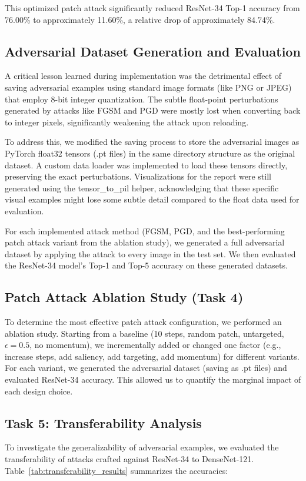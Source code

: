 \documentclass[letterpaper]{article}
\begin{document}
This optimized patch attack significantly reduced ResNet-34 Top-1 accuracy from 76.00\% to approximately 11.60\%, a relative drop of approximately 84.74\%.


\subsection{Adversarial Dataset Generation and Evaluation}
A critical lesson learned during implementation was the detrimental effect of saving adversarial examples using standard image formats (like PNG or JPEG) that employ 8-bit integer quantization. The subtle float-point perturbations generated by attacks like FGSM and PGD were mostly lost when converting back to integer pixels, significantly weakening the attack upon reloading.

To address this, we modified the saving process to store the adversarial images as PyTorch float32 tensors (.pt files) in the same directory structure as the original dataset. A custom data loader was implemented to load these tensors directly, preserving the exact perturbations. Visualizations for the report were still generated using the tensor\_to\_pil helper, acknowledging that these specific visual examples might lose some subtle detail compared to the float data used for evaluation.

For each implemented attack method (FGSM, PGD, and the best-performing patch attack variant from the ablation study), we generated a full adversarial dataset by applying the attack to every image in the test set. We then evaluated the ResNet-34 model's Top-1 and Top-5 accuracy on these generated datasets.

\subsection{Patch Attack Ablation Study (Task 4)}
To determine the most effective patch attack configuration, we performed an ablation study. Starting from a baseline (10 steps, random patch, untargeted, $\epsilon=0.5$, no momentum), we incrementally added or changed one factor (e.g., increase steps, add saliency, add targeting, add momentum) for different variants. For each variant, we generated the adversarial dataset (saving as .pt files) and evaluated ResNet-34 accuracy. This allowed us to quantify the marginal impact of each design choice.

\subsection{Task 5: Transferability Analysis }
To investigate the generalizability of adversarial examples, we evaluated the transferability of attacks crafted against ResNet-34 to DenseNet-121. Table~\ref{tab:transferability_results} summarizes the accuracies:
\end{document}
